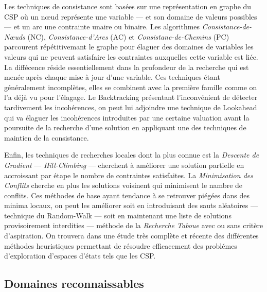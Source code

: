 Les techniques de consistance sont bas\'ees sur une repr\'esentation
en graphe du CSP o\`u un n\oe ud repr\'esente une variable --- et
son domaine de valeurs possibles --- et un arc une contrainte unaire
ou binaire. Les algorithmes \emph{Consistance-de-N\oe uds} (NC),
\emph{Consistance-d'Arcs} (AC) et \emph{Consistane-de-Chemins} (PC)
parcourent r\'ep\'etitivemant le graphe pour \'elaguer des domaines
de variables les valeurs qui ne peuvent satisfaire les contraintes
auxquelles cette variable est li\'ee. La diff\'ecence r\'eside
essentiellement dans la profondeur de la recherche qui est men\'ee
apr\`es chaque mise \`a jour d'une variable. Ces techniques
\'etant g\'en\'eralement incompl\`etes, elles se combinent avec la
premi\`ere famille comme on l'a d\'ej\`a vu pour l'\'elagage. Le
Backtracking pr\'esentant l'inconv\'enient de d\'etecter
tardivement les incoh\'erences, on peut lui adjoindre une technique
de Lookahead qui va \'elaguer les incoh\'erences introduites par une
certaine valuation avant la poursuite de la recherche d'une solution
en appliquant une des techniques de maintien de la consistance.

Enfin, les techniques de recherches locales dont la plus connue est la
\emph{Descente de Gradient}  --- \emph{Hill-Climbing} --- cherchent
\`a am\'eliorer une solution partielle en accroissant par \'etape
le nombre de contraintes satisfaites. La \emph{Minimisation des
  Conflits} cherche en plus les solutions voisinent qui minimisent le
nambre de conflits. Ces m\'ethodes de base ayant tendance \`a se
retrouver \og pi\'eg\'ees\fg{} dans des minima locaux, on peut les
am\'eliorer soit en introduisant des sauts al\'eatoires ---
technique du Random-Walk --- soit en maintenant une liste de solutions
provisoirement interdities --- m\'ethode de la \emph{Recherche
  Taboue} avec ou sans crit\`ere d'aspiration. On trouvera dans
\cite{modern-heuristics} une \'etude tr\`es compl\`ete et r\'ecente
des diff\'erentes m\'ethodes heuristiques permettant de r\'esoudre
efficacement des probl\'emes d'exploration d'espaces d'\'etats tels
que les CSP.

\subsection{Domaines reconnaissables}

